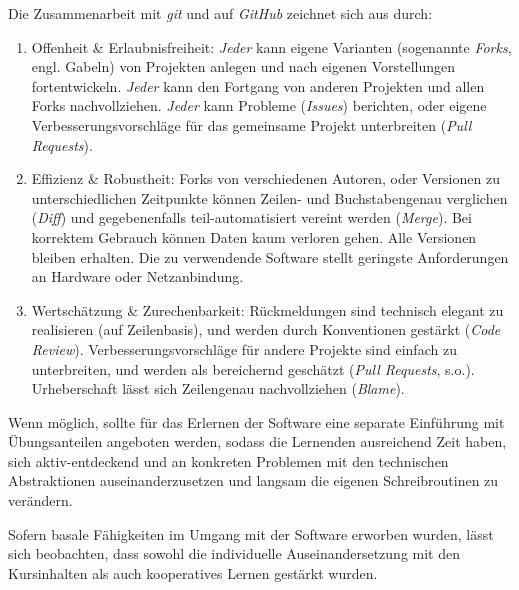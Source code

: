 \documentclass
	[
		11pt,
		a4paper,
		oneside,
		ngerman
	]
	{article}
\begin{document}
Die Zusammenarbeit mit \emph{git} und auf \emph{GitHub} zeichnet sich aus durch:
\begin{enumerate}
	\item Offenheit \& Erlaubnisfreiheit:
		\emph{Jeder} kann eigene Varianten (sogenannte \emph{Forks}, engl. Gabeln) von Projekten anlegen und nach eigenen Vorstellungen fortentwickeln.
		\emph{Jeder} kann den Fortgang von anderen Projekten und allen Forks nachvollziehen.
		\emph{Jeder} kann Probleme (\emph{Issues}) berichten, oder eigene Verbesserungsvorschläge für das gemeinsame Projekt unterbreiten (\emph{Pull Requests}).
	\item Effizienz \& Robustheit:
		Forks von verschiedenen Autoren, oder Versionen zu unterschiedlichen Zeitpunkte können Zeilen- und Buchstabengenau verglichen (\emph{Diff}) und gegebenenfalls teil-automatisiert vereint werden (\emph{Merge}).
		Bei korrektem Gebrauch können Daten kaum verloren gehen.
		Alle Versionen bleiben erhalten.
		Die zu verwendende Software stellt geringste Anforderungen an Hardware oder Netzanbindung.
	\item Wertschätzung \& Zurechenbarkeit:
		Rückmeldungen sind technisch elegant zu realisieren (auf Zeilenbasis), und werden durch Konventionen gestärkt (\emph{Code Review}).
		Verbesserungsvorschläge für andere Projekte sind einfach zu unterbreiten, und werden als bereichernd geschätzt (\emph{Pull Requests}, s.o.).
		Urheberschaft lässt sich Zeilengenau nachvollziehen (\emph{Blame}).
\end{enumerate}

Wenn möglich, sollte für das Erlernen der Software eine separate Einführung mit Übungsanteilen angeboten werden, sodass die Lernenden ausreichend Zeit haben, sich aktiv-entdeckend und an konkreten Problemen mit den technischen Abstraktionen auseinanderzusetzen und langsam die eigenen Schreibroutinen zu verändern.

Sofern basale Fähigkeiten im Umgang mit der Software erworben wurden, lässt sich beobachten, dass sowohl die individuelle Auseinandersetzung mit den Kursinhalten als auch kooperatives Lernen \textcite[vgl.][]{johnson-1999} gestärkt wurden.
\end{document}
